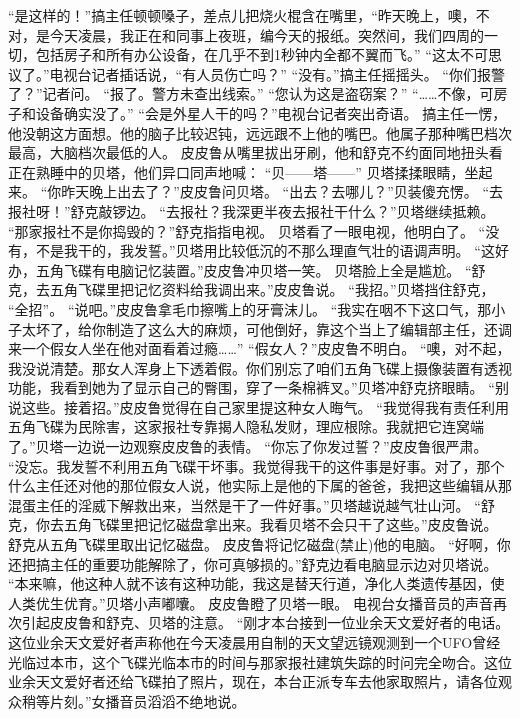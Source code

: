 \documentclass[a4paper,12pt,UTF8,twoside]{ctexbook}
\begin{document}
        “是这样的！”搞主任顿顿嗓子，差点儿把烧火棍含在嘴里，“昨天晚上，噢，不对，是今天凌晨，我正在和同事上夜班，编今天的报纸。突然间，我们四周的一切，包括房子和所有办公设备，在几乎不到1秒钟内全都不翼而飞。” 
        “这太不可思议了。”电视台记者插话说，“有人员伤亡吗？” 
        “没有。”搞主任摇摇头。 
        “你们报警了？”记者问。 
        “报了。警方未查出线索。” 
        “您认为这是盗窃案？” 
        “……不像，可房子和设备确实没了。” 
        “会是外星人干的吗？”电视台记者突出奇语。 
        搞主任一愣，他没朝这方面想。他的脑子比较迟钝，远远跟不上他的嘴巴。他属子那种嘴巴档次最高，大脑档次最低的人。 
        皮皮鲁从嘴里拔出牙刷，他和舒克不约面同地扭头看正在熟睡中的贝塔，他们异口同声地喊： 
        “贝——塔——” 
        贝塔揉揉眼睛，坐起来。 
        “你昨天晚上出去了？”皮皮鲁问贝塔。 
        “出去？去哪儿？”贝装傻充愣。 
        “去报社呀！”舒克敲锣边。 
        “去报社？我深更半夜去报社干什么？”贝塔继续抵赖。 
        “那家报社不是你捣毁的？”舒克指指电视。 
        贝塔看了一眼电视，他明白了。 
        “没有，不是我干的，我发誓。”贝塔用比较低沉的不那么理直气壮的语调声明。 
        “这好办，五角飞碟有电脑记忆装置。”皮皮鲁冲贝塔一笑。 
        贝塔脸上全是尴尬。 
        “舒克，去五角飞碟里把记忆资料给我调出来。”皮皮鲁说。 
        “我招。”贝塔挡住舒克，  “全招”。 
        “说吧。”皮皮鲁拿毛巾擦嘴上的牙膏沫儿。 
        “我实在咽不下这口气，那小子太坏了，给你制造了这么大的麻烦，可他倒好，靠这个当上了编辑部主任，还调来一个假女人坐在他对面看着过瘾……” 
        “假女人？”皮皮鲁不明白。 
        “噢，对不起，我没说清楚。那女人浑身上下透着假。你们别忘了咱们五角飞碟上摄像装置有透视功能，我看到她为了显示自己的臀围，穿了一条棉裤叉。”贝塔冲舒克挤眼睛。 
        “别说这些。接着招。”皮皮鲁觉得在自己家里提这种女人晦气。 
        “我觉得我有责任利用五角飞碟为民除害，这家报社专靠揭人隐私发财，理应根除。我就把它连窝端了。”贝塔一边说一边观察皮皮鲁的表情。 
        “你忘了你发过誓？”皮皮鲁很严肃。 
        “没忘。我发誓不利用五角飞碟干坏事。我觉得我干的这件事是好事。对了，那个什么主任还对他的那位假女人说，他实际上是他的下属的爸爸，我把这些编辑从那混蛋主任的淫威下解救出来，当然是干了一件好事。”贝塔越说越气壮山河。 
        “舒克，你去五角飞碟里把记忆磁盘拿出来。我看贝塔不会只干了这些。”皮皮鲁说。 
        舒克从五角飞碟里取出记忆磁盘。 
        皮皮鲁将记忆磁盘(禁止)他的电脑。 
        “好啊，你还把搞主任的重要功能解除了，你可真够损的。”舒克边看电脑显示边对贝塔说。 
        “本来嘛，他这种人就不该有这种功能，我这是替天行道，净化人类遗传基因，使人类优生优育。”贝塔小声嘟囔。 
        皮皮鲁瞪了贝塔一眼。 
        电视台女播音员的声音再次引起皮皮鲁和舒克、贝塔的注意。 
        “刚才本台接到一位业余天文爱好者的电话。这位业余天文爱好者声称他在今天凌晨用自制的天文望远镜观测到一个UFO曾经光临过本市，这个飞碟光临本市的时间与那家报社建筑失踪的时问完全吻合。这位业余天文爱好者还给飞碟拍了照片，现在，本台正派专车去他家取照片，请各位观众稍等片刻。”女播音员滔滔不绝地说。 
\end{document}
